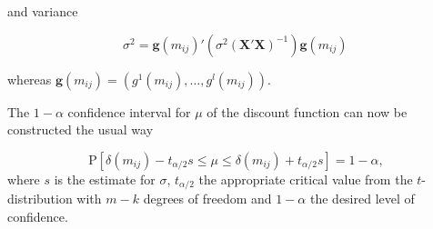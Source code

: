 and variance

\begin{equation*}
\sigma^2 = \bm{g}(m_{ij})'\left(\sigma^2(\bm{X' X})^{-1} \right)\bm{g}(m_{ij})\,
\end{equation*}

whereas $\bm{g}(m_{ij})= \left(g^1(m_{ij}), \dots, g^l(m_{ij}) \right)$.


 The $1- \alpha$ confidence interval for $\mu$ of the discount function can now be constructed the usual way

\begin{equation*}
\label{eq:cint}
\mbox{P}\left[ \delta(m_{ij}) - t_{\alpha / 2} s   \leq \mu  \leq \delta(m_{ij})  + t_{\alpha / 2} s\right]= 1 - \alpha,
\end{equation*} 
where $s$ is the estimate for $\sigma$, $t_{\alpha / 2}$ the appropriate critical value from the $t$-distribution with $m-k$ degrees of freedom and $1-\alpha$ the desired level of confidence. 















